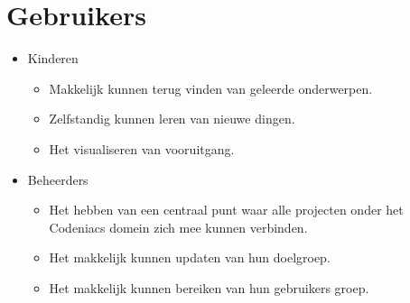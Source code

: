 \documentclass[]{report}
\begin{document}
\section{Gebruikers}
\begin{itemize}
	\item Kinderen 
	\begin{itemize}
		\item Makkelijk kunnen terug vinden van geleerde onderwerpen.
		\item Zelfstandig kunnen leren van nieuwe dingen.
		\item Het visualiseren van vooruitgang.
			\newline
	\end{itemize} 
	
	\item Beheerders
	\begin{itemize}
		\item Het hebben van een centraal punt waar alle projecten onder het Codeniacs domein zich mee kunnen verbinden.
		\item Het makkelijk kunnen updaten van hun doelgroep.
		\item Het makkelijk kunnen bereiken van hun gebruikers groep.
		\newline
	\end{itemize} 
\end{itemize}
\end{document}
